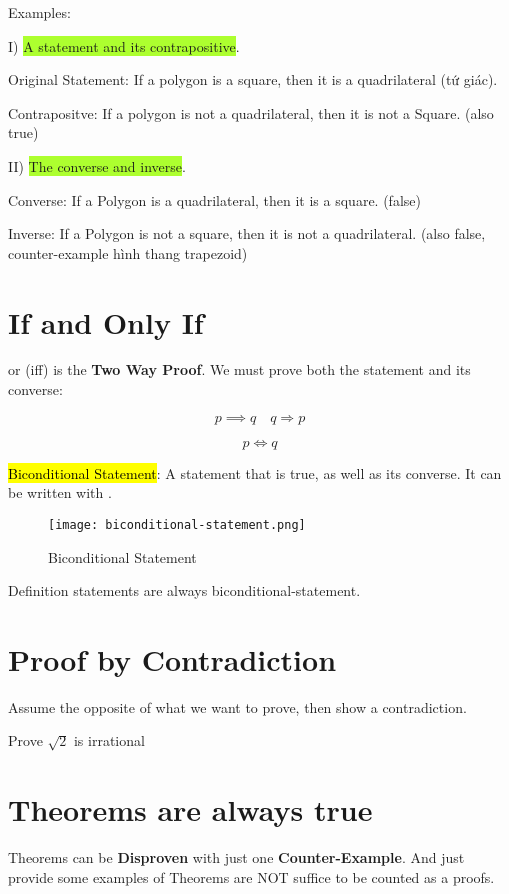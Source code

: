 Examples:

I) \colorbox{GreenYellow}{A statement and its contrapositive}.

Original Statement: If a polygon is a square, then it is a quadrilateral (tứ giác).

Contrapositve: If a polygon is not a quadrilateral, then it is not a Square. (also true)

\vspace{.4cm}

II) \colorbox{GreenYellow}{The converse and inverse}.

Converse: If a Polygon is a quadrilateral, then it is a square. (false)

Inverse: If a Polygon is not a square, then it is not a quadrilateral. (also false, counter-example hình thang trapezoid)

\section{If and Only If}

 or (iff) is the \textbf{Two Way Proof}. We must prove both the statement and its converse:

\[p \implies q \quad q \Longrightarrow p\]

\[p \iff q\]

\hl{Biconditional Statement}: A statement that is true, as well as its converse. It can be written with .

\begin{figure}[htb!]
  \centering
  \texttt{[image: biconditional-statement.png]}
  \caption{Biconditional Statement}
\end{figure}

Definition statements are always biconditional-statement.

\section{Proof by Contradiction}

Assume the opposite of what we want to prove, then show a contradiction.

Prove $\sqrt{2}$ is irrational

\section{Theorems are always true}

Theorems can be \textbf{Disproven} with just one \textbf{Counter-Example}. And just provide some examples of Theorems are NOT suffice to be counted as a proofs.


